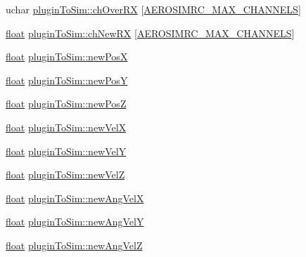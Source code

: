 \begin{DoxyCompactItemize}
uchar \hyperlink{group___aero_sim_r_c_ga3fe5834da184407de8227a046d5a7de7}{plugin\-To\-Sim\-::ch\-Over\-R\-X} \mbox{[}\hyperlink{group___aero_sim_r_c_ga63f989ac10cdcbfefadc5e65055d3c7d}{A\-E\-R\-O\-S\-I\-M\-R\-C\-\_\-\-M\-A\-X\-\_\-\-C\-H\-A\-N\-N\-E\-L\-S}\mbox{]}
\item 
\hyperlink{_super_l_u_support_8h_a6a1bb6ed41f44b60e7bd83b0e9945aa7}{float} \hyperlink{group___aero_sim_r_c_gaa465d9eaa30d7a906bd3672768e5b380}{plugin\-To\-Sim\-::ch\-New\-R\-X} \mbox{[}\hyperlink{group___aero_sim_r_c_ga63f989ac10cdcbfefadc5e65055d3c7d}{A\-E\-R\-O\-S\-I\-M\-R\-C\-\_\-\-M\-A\-X\-\_\-\-C\-H\-A\-N\-N\-E\-L\-S}\mbox{]}
\item 
\hyperlink{_super_l_u_support_8h_a6a1bb6ed41f44b60e7bd83b0e9945aa7}{float} \hyperlink{group___aero_sim_r_c_ga2067141174f8fa27f36b9831b73b5668}{plugin\-To\-Sim\-::new\-Pos\-X}
\item 
\hyperlink{_super_l_u_support_8h_a6a1bb6ed41f44b60e7bd83b0e9945aa7}{float} \hyperlink{group___aero_sim_r_c_gab0bd49c25f923d60f12c350160c63f4f}{plugin\-To\-Sim\-::new\-Pos\-Y}
\item 
\hyperlink{_super_l_u_support_8h_a6a1bb6ed41f44b60e7bd83b0e9945aa7}{float} \hyperlink{group___aero_sim_r_c_ga85e01d3ec1ec3924a0482565262ccd80}{plugin\-To\-Sim\-::new\-Pos\-Z}
\item 
\hyperlink{_super_l_u_support_8h_a6a1bb6ed41f44b60e7bd83b0e9945aa7}{float} \hyperlink{group___aero_sim_r_c_ga963869a7b3f6432a6b42f9f239de0ca8}{plugin\-To\-Sim\-::new\-Vel\-X}
\item 
\hyperlink{_super_l_u_support_8h_a6a1bb6ed41f44b60e7bd83b0e9945aa7}{float} \hyperlink{group___aero_sim_r_c_ga4ef77620e6e374b2af2bbd4e0d88fcfe}{plugin\-To\-Sim\-::new\-Vel\-Y}
\item 
\hyperlink{_super_l_u_support_8h_a6a1bb6ed41f44b60e7bd83b0e9945aa7}{float} \hyperlink{group___aero_sim_r_c_ga09bc17352168fa2e9b782170e27c7c2b}{plugin\-To\-Sim\-::new\-Vel\-Z}
\item 
\hyperlink{_super_l_u_support_8h_a6a1bb6ed41f44b60e7bd83b0e9945aa7}{float} \hyperlink{group___aero_sim_r_c_gafd7e1d21996abb68824a65505d845744}{plugin\-To\-Sim\-::new\-Ang\-Vel\-X}
\item 
\hyperlink{_super_l_u_support_8h_a6a1bb6ed41f44b60e7bd83b0e9945aa7}{float} \hyperlink{group___aero_sim_r_c_gafe0593ec5f2487320a352c0f8bcb2f2d}{plugin\-To\-Sim\-::new\-Ang\-Vel\-Y}
\item 
\hyperlink{_super_l_u_support_8h_a6a1bb6ed41f44b60e7bd83b0e9945aa7}{float} \hyperlink{group___aero_sim_r_c_ga6e895029ebb998be74c53cea057e83cf}{plugin\-To\-Sim\-::new\-Ang\-Vel\-Z}

\end{DoxyCompactItemize}
